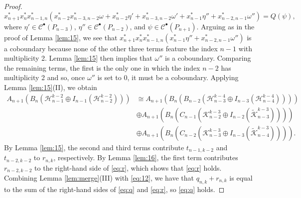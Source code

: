\documentclass[12pt]{amsart}
\theoremstyle{definition}
\begin{document}
\begin{proof}
\[
x_{n+1}^*x_n^*x_{n-1,n}^*(x_{n-2}^*x_{n-3,n-2}^*\omega+x_{n-2}^*\eta'+x_{n-3,n-2}^*\omega'+x_{n-1}^*\eta''+x_{n-2,n-1}^*\omega'')=Q(\psi),
\]
where $\eta'\in \mathcal C^\bullet(P_{n-3})$, $\eta''\in \mathcal C^\bullet(P_{n-2})$, and $\psi\in \mathcal C^\bullet(P_{n+1})$. Arguing as in the proof of Lemma \ref{lem:15}, we see that $x_{n+1}^*x_n^*x_{n-1,n}^*(x_{n-1}^*\eta''+x_{n-2,n-1}^*\omega'')$ is a coboundary because none of the other three terms feature the index $n-1$ with multiplicity 2. Lemma \ref{lem:15} then implies that $\omega''$ is a coboundary.  Comparing the remaining terms, the first is the only one in which the index $n-2$ has multiplicity 2 and so, once $\omega''$ is set to 0, it must be a coboundary. Applying Lemma \ref{lem:15}(II), we obtain 
\begin{align*}
A_{n+1}(B_n(\mathcal H_{n-1}^{k-2}\oplus I_{n-1}(\mathcal H_{n-2}^{k-2}) ))& \cong A_{n+1}(B_n(B_{n-2}(\mathcal H_{n-3}^{k-4}\oplus I_{n-3}(\mathcal H_{n-4}^{k-4}))))\\
&\oplus A_{n+1}(B_n(C_{n-1}(\mathcal K_{n-2}^{k-3}\oplus I_{n-2}(\widetilde {\mathcal K}_{n-3}^{k-3}))))\\
&\oplus A_{n+1}(B_n(C_{n-2}(\mathcal K_{n-3}^{k-3}\oplus I_{n-3}(\widetilde {\mathcal K}_{n-4}^{k-3})))).
\end{align*}
By Lemma \ref{lem:15}, the second and third terms contribute $t_{n-1,k-2}$ and $t_{n-2,k-2}$ to $r_{n,k}$, respectively. By Lemma \ref{lem:16}, the first term contributes $r_{n-2,k-2}$ to the right-hand side of \eqref{eq:r}, which shows that \eqref{eq:r} holds. Combining Lemma \ref{lem:merge}(III) with \eqref{eq:12}, we have that $q_{n,k}+r_{n,k}$ is equal to the sum of the right-hand sides of \eqref{eq:q} and \eqref{eq:r}, so \eqref{eq:q} holds.
\end{proof}
\end{document}
